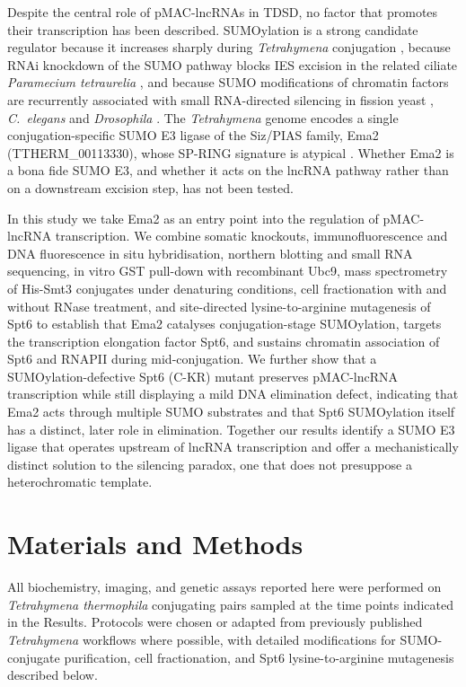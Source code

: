 \documentclass[11pt]{article}
\begin{document}
Despite the central role of pMAC-lncRNAs in TDSD, no factor that promotes
their transcription has been described. SUMOylation is a strong candidate
regulator because it increases sharply during \emph{Tetrahymena}
conjugation \citep{nasir2015sumo}, because RNAi knockdown of the SUMO
pathway blocks IES excision in the related ciliate \emph{Paramecium
tetraurelia} \citep{matsuda2006sumo}, and because SUMO modifications of
chromatin factors are recurrently associated with small RNA-directed
silencing in fission yeast \citep{shin2005sumo}, \emph{C.~elegans}
\citep{kim2021hdac1} and \emph{Drosophila} \citep{ninova2019suvar}.
The \emph{Tetrahymena} genome encodes a single conjugation-specific SUMO
E3 ligase of the Siz/PIAS family, Ema2 (TTHERM\_00113330), whose SP-RING
signature is atypical \citep{hochstrasser2001spring}. Whether Ema2 is a
bona fide SUMO E3, and whether it acts on the lncRNA pathway rather than
on a downstream excision step, has not been tested.

In this study we take Ema2 as an entry point into the regulation of
pMAC-lncRNA transcription. We combine somatic knockouts, immunofluorescence
and DNA fluorescence in situ hybridisation, northern blotting and small
RNA sequencing, in vitro GST pull-down with recombinant Ubc9, mass
spectrometry of His-Smt3 conjugates under denaturing conditions, cell
fractionation with and without RNase treatment, and site-directed
lysine-to-arginine mutagenesis of Spt6 to establish that Ema2 catalyses
conjugation-stage SUMOylation, targets the transcription elongation factor
Spt6, and sustains chromatin association of Spt6 and RNAPII during
mid-conjugation. We further show that a SUMOylation-defective Spt6
(C-KR) mutant preserves pMAC-lncRNA transcription while still displaying
a mild DNA elimination defect, indicating that Ema2 acts through multiple
SUMO substrates and that Spt6 SUMOylation itself has a distinct, later
role in elimination. Together our results identify a SUMO E3 ligase that
operates upstream of lncRNA transcription and offer a mechanistically
distinct solution to the silencing paradox, one that does not presuppose
a heterochromatic template.

\section{Materials and Methods}

All biochemistry, imaging, and genetic assays reported here were performed
on \emph{Tetrahymena thermophila} conjugating pairs sampled at the time
points indicated in the Results. Protocols were chosen or adapted from
previously published \emph{Tetrahymena} workflows where possible, with
detailed modifications for SUMO-conjugate purification, cell
fractionation, and Spt6 lysine-to-arginine mutagenesis described below.
\end{document}
